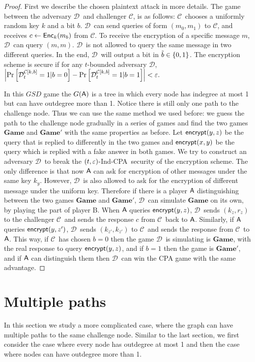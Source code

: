 \documentclass{article}
\newcommand{\tcpa}{$(t,\eps)$-Ind-CPA}
\def\B{{\sf B}}
\def\A{{\sf A}}
\def\a {${\mathcal D}$}
\def\ch {${\mathcal C}$}
\newcommand{\encrypt}{{\sf encrypt}}
\newcommand{\dgame}{{\mathbf{Game}}}
\begin{document}
\begin{proof}
First we describe the chosen plaintext attack in more details. The game between the adversary \a~and challenger \ch, is as follows: \ch~chooses a uniformly random key $k$ and a bit $b$. \a~can send queries of form $(m_0,m_1)$ to \ch, and receives $c\leftarrow {\sf Enc}_k(m_b)$ from \ch. To receive the encryption of a specific message $m$, \a~can query $(m,m)$. \a~is not allowed to query the same message in two different queries. In the end, \a~will output a bit in $\tilde{b}\in \{0,1\}$. The encryption scheme is secure if for any $t$-bounded adversary \a, $\left| \Pr \left[ \mathcal{D}_t^{\mathcal{C}[k,b]}=1|b=0 \right] - \Pr \left[ \mathcal{D}_t^{\mathcal{C}[k,b]}=1|b=1 \right]  \right|< \varepsilon.$

 In this $GSD$ game the $G(\A)$ is a tree in which every node has indegree at most 1 but can have outdegree more than 1. Notice there is still only one path to the challenge node. Thus we can use the same method we used before: we guess the path to the challenge node gradually in a series of games and find the two games $\dgame$ and $\dgame'$ with the same properties as before. Let $\encrypt(y,z)$ be the query that is replied to differently in the two games and $\encrypt(x,y)$ be the query which is replied with a fake answer in both games. We try to construct an adversary \a~to break the \tcpa~security of the encryption scheme. The only difference is that now $\A$ can ask for encryption of other messages under the same key $k_y$. However, \a~is also allowed to ask for the encryption of different message under the uniform key. Therefore if there is a player $\A$ distinguishing between the two games $\dgame$ and $\dgame'$, \a~can simulate $\dgame$ on its own, by playing the part of player \B. When $\A$ queries $\encrypt(y,z)$, \a~sends $(k_z,r_z)$ to the challenger \ch~and sends the response $c$ from \ch~back to $\A$. Similarly, if $\A$ queries $\encrypt(y,z')$, \a~sends $(k_{z'},k_{z'})$ to \ch~and sends the response from \ch~to $\A$. This way, if \ch~has chosen $b=0$ then the game \a~is simulating is $\dgame$, with the real response to query $\encrypt(y,z)$, and if $b=1$ then the game is $\dgame'$, and if $\A$ can distinguish them then \a~can win the CPA game with the same advantage.
\end{proof}

\section{Multiple paths}

In this section we study a more complicated case, where the graph can have multiple paths to the same challenge node. Similar to the last section, we first consider the case where every node has outdegree at most 1 and then the case where nodes can have outdegree more than 1.
\end{document}
